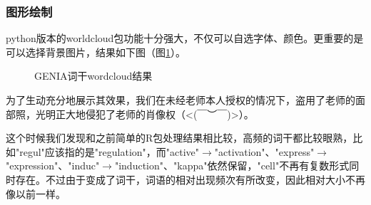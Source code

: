 \documentclass{article}
\begin{document}
\subsubsection{图形绘制}
python版本的worldcloud包功能十分强大，不仅可以自选字体、颜色。更重要的是可以选择背景图片，结果如下图（图\ref{zczxzx}）。
\begin{figure}[H]
  \centering
  \caption{GENIA词干wordcloud结果}
  \label{zczxzx}
\end{figure}
为了生动充分地展示其效果，我们在未经老师本人授权的情况下，盗用了老师的面部照，光明正大地侵犯了老师的肖像权（<(￣︶￣)>）。\par
这个时候我们发现和之前简单的R包处理结果相比较，高频的词干都比较眼熟，比如"regul"应该指的是"regulation"，而"active"$\rightarrow$"activation"、"express"$\rightarrow$"expression"、"induc"$\rightarrow$"induction"、"kappa"依然保留，"cell"不再有复数形式同时存在。不过由于变成了词干，词语的相对出现频次有所改变，因此相对大小不再像以前一样。
\end{document}
